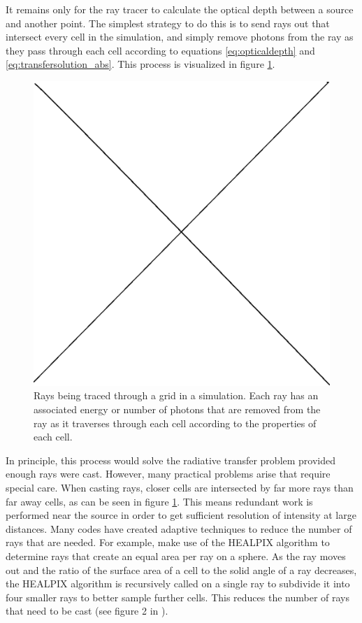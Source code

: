 It remains only for the ray tracer to calculate the optical depth between a source and another point. The simplest strategy to do this is to send rays out that intersect every cell in the simulation, and simply remove photons from the ray as they pass through each cell according to equations \ref{eq:opticaldepth} and \ref{eq:transfersolution_abs}. This process is visualized in figure \ref{fig:raytracing}.

\begin{figure}
\label{fig:raytracing}
\includegraphics[width=\textwidth]{graphics/placeholder.eps}
\caption[A visualization of ray tracing.]{Rays being traced through a grid in a simulation. Each ray has an associated energy or number of photons that are removed from the ray as it traverses through each cell according to the properties of each cell.}
\end{figure}

In principle, this process would solve the radiative transfer problem provided enough rays were cast. However, many practical problems arise that require special care. When casting rays, closer cells are intersected by far more rays than far away cells, as can be seen in figure \ref{fig:raytracing}. This means redundant work is performed near the source in order to get sufficient resolution of intensity at large distances. Many codes have created adaptive techniques to reduce the number of rays that are needed. For example, \citet{abelWandelt02} make use of the HEALPIX algorithm \citep{gorskiEt99} to determine rays that create an equal area per ray on a sphere. As the ray moves out and the ratio of the surface area of a cell to the solid angle of a ray decreases, the HEALPIX algorithm is recursively called on a single ray to subdivide it into four smaller rays to better sample further cells. This reduces the number of rays that need to be cast (see figure 2 in \citet{abelWandelt02}).

